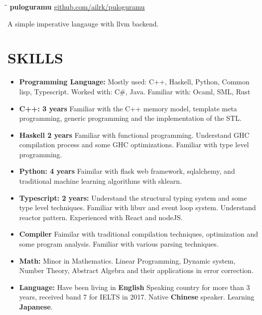 \documentclass{res}
\begin{document}
\begin{resume}
    \vspace{-0.2in}
    \begin{tabbing}
        \hspace{2.4in}\= \hspace{0.9in}\= \kill
        {\bf puloguramu } \>               \>\url{github.com/ailrk/puloguramu}\\

    \end{tabbing}\vspace{-30pt}
    A simple imperative langauge with llvm backend.


\section{SKILLS}
    \begin{itemize}[leftmargin=-.2in]
        \setlength\itemsep{-1em}
        \item \textbf{Programming Language:} Mostly used: C++, Haskell, Python, Common lisp, Typescript. Worked with: C\#, Java. Familiar with: Ocaml, SML, Rust \\
        \item \textbf{C++: 3 years}
          Familiar with the C++ memory model, template meta programming,
          generic programming and the implementation of the STL.  \\
        \item \textbf{Haskell 2 years}
          Familiar with functional programming.
          Understand GHC compilation process and some GHC optimizations.
          Familiar with type level programming.\\
        \item \textbf{Python: 4 years}
          Faimilar with flask web framework, sqlalchemy, and
          traditional machine learning algorithms with sklearn. \\
        \item \textbf{Typescript: 2 years:}
          Understand the structural typing system and some type level techniques.
          Familiar with libuv and event loop system. Understand reactor pattern.
          Experienced with React and nodeJS. \\
        \item \textbf{Compiler} Faimilar with traditional compilation techniques, optimization and some program analysis. Familiar with various parsing techniques. \\
        \item \textbf{Math:}
          Minor in Mathematics.
          Linear Programming, Dynamic system, Number Theory, Abstract Algebra and their applications in error correction.  \\
        \item \textbf{Language:} Have been living in \textbf{English} Speaking country for more than 3 years, received band 7 for IELTS in 2017. Native \textbf{Chinese} speaker. Learning \textbf{Japanese}.
    \end{itemize}

\end{resume}
\end{document}
